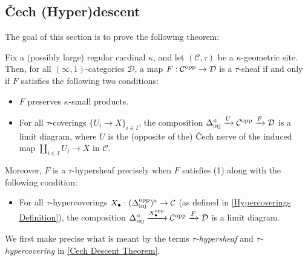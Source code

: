 \documentclass[10pt]{article}
\newcommand{\C}{\mathcal C}
\newcommand{\cD}{\mathcal{D}}
\theoremstyle{witharg}
\theoremstyle{witharg}
\theoremstyle{witharg2}
\begin{document}
\subsection{\v{C}ech (Hyper)descent}\label{Cech Descent}


The goal of this section is to prove the following theorem:

\begin{theorem}{}\label{Cech Descent Theorem}

    Fix a (possibly large) regular cardinal $\kappa$, and let $(\C,\tau)$ be a $\kappa$-geometric site. Then, for all $(\infty,1)$-categories $\cD$, a map $F:\C^{\textnormal{opp}}\rightarrow \cD$ is a $\tau$-sheaf if and only if $F$ satisfies the following two conditions:

    \begin{itemize}
    
        \item [$(1)$] $F$ preserves $\kappa$-small products. 

        \item [$(2)$] For all $\tau$-coverings $\{U_i\rightarrow X\}_{i\in I}$, the composition $\Delta_{\textnormal{inj}}^\triangleleft\xrightarrow{U}\C^{\textnormal{opp}}\xrightarrow{F}\cD$ is a limit diagram, where $U$ is the (opposite of the) \v{C}ech nerve of the induced map $\coprod_{i\in I}U_i\rightarrow X$ in $\C$. 

    \end{itemize}

    \noindent Moreover, $F$ is a $\tau$-hypersheaf precisely when $F$ satisfies (1) along with the following condition:

    \begin{itemize}
    
        \item [$(2^\prime)$] For all $\tau$-hypercoverings $X_\bullet:(\Delta^{\textnormal{opp}}_{\textnormal{inj}})^\triangleright\rightarrow \C$ (as defined in \ref{Hypercoverings Definition}), the composition $\Delta_{\textnormal{inj}}^\triangleleft\xrightarrow{X_\bullet^{\textnormal{opp}}}\C^{\textnormal{opp}}\xrightarrow{F}\cD$ is a limit diagram.

    \end{itemize}

   
    
\end{theorem}

\noindent We first make precise what is meant by the terms \emph{$\tau$-hypersheaf} and \emph{$\tau$-hypercovering} in \ref{Cech Descent Theorem}. 
\end{document}
